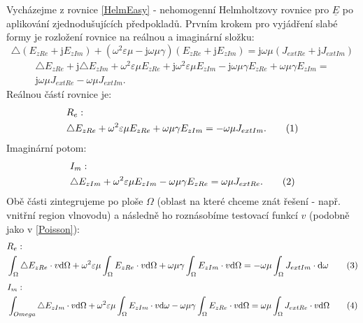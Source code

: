 \documentclass[12pt,a4paper,oneside]{article}
\numberwithin{equation}{section} %
\numberwithin{figure}{section} %
\numberwithin{table}{section} %
\newcommand{\mj}{\mathrm{j}} %
\newcommand{\faz}[1]{{\underline{#1}}} %
\newcommand\numberthis{\addtocounter{equation}{1}\tag{\theequation}}
\begin{document}
Vycházejme z rovnice \ref{HelmEasy} - nehomogenní Helmholtzovy rovnice pro $\faz{E}$ po aplikování zjednodušujících předpokladů. Prvním krokem pro vyjádření slabé formy je rozložení rovnice na reálnou a imaginární složku:
\begin{equation}
\triangle (E _{zRe} + \mj E _{zIm}) + (\omega ^2 \varepsilon \mu - \mj \omega \mu \gamma) (E _{zRe} + \mj E _{zIm}) = \mj \omega \mu (J _{extRe} + \mj J _{extIm})
\end{equation}
\begin{equation}
\begin{split}
\triangle E _{zRe} + \mj \triangle E _{zIm} + \omega ^2 \varepsilon \mu E_ {zRe} + \mj \omega ^2 \varepsilon \mu E _{zIm} - \mj \omega \mu \gamma E _{zRe} + \omega \mu \gamma E _{zIm} =\\
\mj \omega \mu J _{extRe} - \omega \mu J _{extIm} .
\end{split}
\end{equation}
Reálnou částí rovnice je:
\begin{align*}
&R_{e}:
\\
&\triangle E_ {zRe} + \omega ^2 \varepsilon \mu E_ {zRe} + \omega \mu \gamma E _{zIm} = - \omega \mu J _{extIm} .
\numberthis
\end{align*}
Imaginární potom:
\begin{align*}
&I_{m}:
\\
&\triangle E _{zIm} + \omega ^2 \varepsilon \mu E _{zIm} - \omega \mu \gamma E _{zRe} = \omega \mu J _{extRe} .
\numberthis
\end{align*}
Obě části zintegrujeme po ploše $\Omega$ (oblast na které chceme znát řešení - např. vnitřní region vlnovodu) a následně ho roznásobíme testovací funkcí $v$ (podobně jako v \ref{Poisson}):
\begin{align*}
&R_e:
\\
&\int _{\Omega} \triangle E _{zRe} \cdot v \ud \Omega + \omega ^2 \varepsilon \mu \int _{\Omega} E _{zRe} \cdot v \ud \Omega + \omega \mu \gamma \int _{\Omega} E _{zIm} \cdot v \ud \Omega = - \omega \mu \int _{\Omega} J _{extIm} \cdot \ud \omega
\numberthis
\end{align*}
\begin{align*}
&I_m:
\\
&\int _{Omega} \triangle E _{zIm} \cdot v \ud \Omega + \omega ^2 \varepsilon \mu \int _{\Omega} E _{zIm} \cdot v \ud \omega - \omega \mu \gamma \int _{\Omega} E _{zRe} \cdot v \ud \Omega = \omega \mu \int _{\Omega} J _{extRe} \cdot v \ud \Omega
\numberthis
\end{align*}
\end{document}
